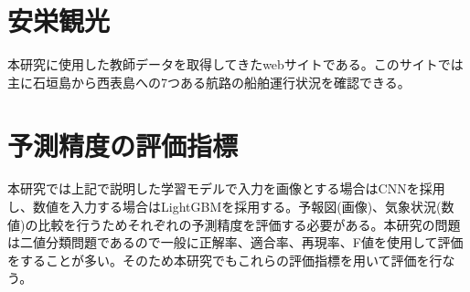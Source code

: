 \section{安栄観光}
本研究に使用した教師データを取得してきたwebサイトである。このサイトでは主に石垣島から西表島への7つある航路の船舶運行状況を確認できる\cite{anei}。


\section{予測精度の評価指標}
本研究では上記で説明した学習モデルで入力を画像とする場合はCNNを採用し、数値を入力する場合はLightGBMを採用する。予報図(画像)、気象状況(数値)の比較を行うためそれぞれの予測精度を評価する必要がある。本研究の問題は二値分類問題であるので一般に正解率、適合率、再現率、F値を使用して評価をすることが多い。そのため本研究でもこれらの評価指標を用いて評価を行なう。%



